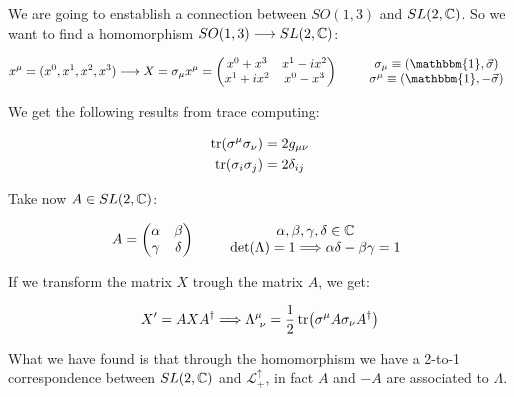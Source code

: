 \documentclass[../../main/main.tex]{subfiles}
\begin{document}
We are going to enstablish a connection between \( SO(1,3) \) and \( SL(2,\mathbb{C}) \). So we want to find a homomorphism \( SO(1,3) \longrightarrow SL(2,\mathbb{C}) \):

\[
    x^\mu = (x^0,x^1,x^2,x^3)
    \longrightarrow
    X = \sigma _{\mu} x^{\mu} =
    \begin{pmatrix}
    x^0+x^3   & x^1 - ix^2 \\
    x^1 + ix^2   & x^0 - x^3
    \end{pmatrix}
    \qquad
    \begin{array}{c}
        \sigma _\mu \equiv (\mathbbm{1},\va{\sigma} )   \\
        \sigma ^\mu \equiv (\mathbbm{1},-\va{\sigma } )
    \end{array}
\]

We get the following results from trace computing:

\begin{align*}
    \tr(\sigma ^\mu \sigma_\nu) &= 2 g_{\mu \nu} \\
    \tr(\sigma _i \sigma _j)  &= 2 \delta _{ij}
\end{align*}

Take now \( A \in SL(2,\mathbb{C}) \):

\[
    A =
    \begin{pmatrix}
    \alpha   & \beta \\
    \gamma    & \delta
    \end{pmatrix}
    \qquad
    \begin{array}{c}
        \alpha, \beta, \gamma, \delta \in \mathbb{C}    \\
        \det(\Lambda) = 1 \Longrightarrow \alpha \delta - \beta \gamma = 1
    \end{array}
\]

If we transform the matrix \( X \) trough the matrix \( A \), we get:

\begin{equation}
    X' = A X A ^\dag
    \Longrightarrow
    \Lambda^{\mu}_{\ \nu} = \frac{1}{2} \tr(\sigma ^\mu A \sigma _\nu A ^\dag )
    \label{eq:}
\end{equation}

What we have found is that through the homomorphism we have a 2-to-1 correspondence between \( SL(2,\mathbb{C}) \) and \( \mathcal{L}^{\uparrow}_{+} \), in fact \( A \) and \( -A \) are associated to \( \Lambda \).
\end{document}
